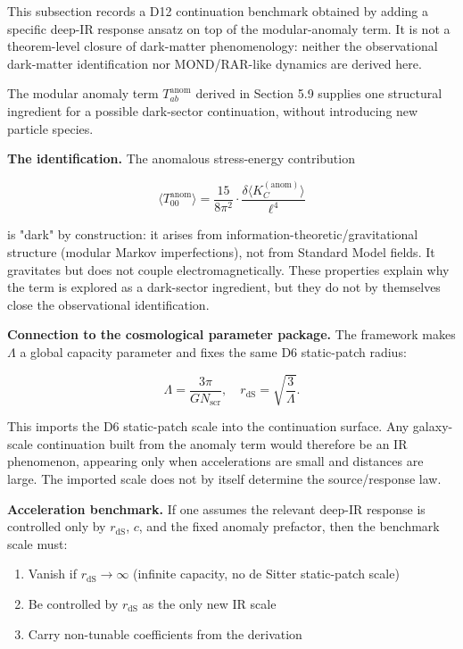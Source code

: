 This subsection records a D12 continuation benchmark obtained by adding a specific deep-IR response ansatz on top of the modular-anomaly term. It is not a theorem-level closure of dark-matter phenomenology: neither the observational dark-matter identification nor MOND/RAR-like dynamics are derived here.

The modular anomaly term \(T_{ab}^{\mathrm{anom}}\) derived in Section 5.9 supplies one structural ingredient for a possible dark-sector continuation, without introducing new particle species.

\textbf{The identification.} The anomalous stress-energy contribution

\[
\langle T_{00}^{\mathrm{anom}} \rangle
= \frac{15}{8\pi^2} \cdot \frac{\delta \langle K_C^{\mathrm{(anom)}} \rangle}{\ell^4}
\]

is "dark" by construction: it arises from information-theoretic/gravitational structure (modular Markov imperfections), not from Standard Model fields. It gravitates but does not couple electromagnetically. These properties explain why the term is explored as a dark-sector ingredient, but they do not by themselves close the observational identification.

\textbf{Connection to the cosmological parameter package.} The framework makes \(\Lambda\) a global capacity parameter and fixes the same D6 static-patch radius:

\[
\Lambda = \frac{3\pi}{G N_{\mathrm{scr}}},
\quad
r_{\mathrm{dS}} = \sqrt{\frac{3}{\Lambda}}.
\]

This imports the D6 static-patch scale into the continuation surface. Any galaxy-scale continuation built from the anomaly term would therefore be an IR phenomenon, appearing only when accelerations are small and distances are large. The imported scale does not by itself determine the source/response law.

\textbf{Acceleration benchmark.} If one assumes the relevant deep-IR response is controlled only by \(r_{\mathrm{dS}}\), \(c\), and the fixed anomaly prefactor, then the benchmark scale must:

\begin{enumerate}
\def\labelenumi{\arabic{enumi}.}
\tightlist
\item
  Vanish if \(r_{\mathrm{dS}} \to \infty\) (infinite capacity, no de Sitter static-patch scale)
\item
  Be controlled by \(r_{\mathrm{dS}}\) as the only new IR scale
\item
  Carry non-tunable coefficients from the derivation
\end{enumerate}

